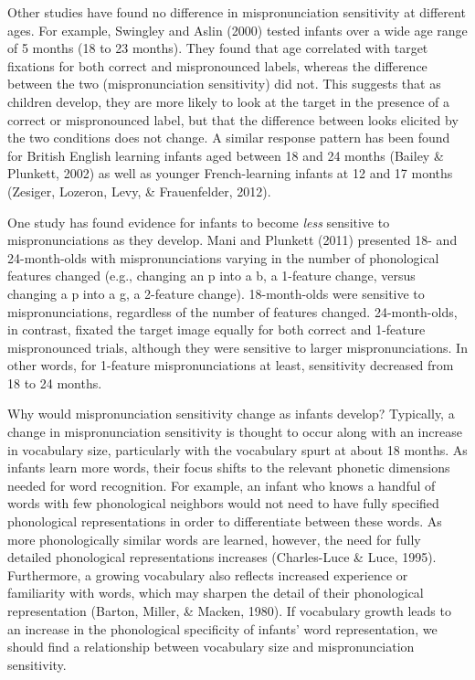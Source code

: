 \documentclass[man]{apa6}
\theoremstyle{definition}
\theoremstyle{definition}
\theoremstyle{definition}
\theoremstyle{remark}
\begin{document}
Other studies have found no difference in mispronunciation sensitivity
at different ages. For example, Swingley and Aslin (2000) tested infants
over a wide age range of 5 months (18 to 23 months). They found that age
correlated with target fixations for both correct and mispronounced
labels, whereas the difference between the two (mispronunciation
sensitivity) did not. This suggests that as children develop, they are
more likely to look at the target in the presence of a correct or
mispronounced label, but that the difference between looks elicited by
the two conditions does not change. A similar response pattern has been
found for British English learning infants aged between 18 and 24 months
(Bailey \& Plunkett, 2002) as well as younger French-learning infants at
12 and 17 months (Zesiger, Lozeron, Levy, \& Frauenfelder, 2012).

One study has found evidence for infants to become \emph{less} sensitive
to mispronunciations as they develop. Mani and Plunkett (2011) presented
18- and 24-month-olds with mispronunciations varying in the number of
phonological features changed (e.g., changing an p into a b, a 1-feature
change, versus changing a p into a g, a 2-feature change). 18-month-olds
were sensitive to mispronunciations, regardless of the number of
features changed. 24-month-olds, in contrast, fixated the target image
equally for both correct and 1-feature mispronounced trials, although
they were sensitive to larger mispronunciations. In other words, for
1-feature mispronunciations at least, sensitivity decreased from 18 to
24 months.

Why would mispronunciation sensitivity change as infants develop?
Typically, a change in mispronunciation sensitivity is thought to occur
along with an increase in vocabulary size, particularly with the
vocabulary spurt at about 18 months. As infants learn more words, their
focus shifts to the relevant phonetic dimensions needed for word
recognition. For example, an infant who knows a handful of words with
few phonological neighbors would not need to have fully specified
phonological representations in order to differentiate between these
words. As more phonologically similar words are learned, however, the
need for fully detailed phonological representations increases
(Charles-Luce \& Luce, 1995). Furthermore, a growing vocabulary also
reflects increased experience or familiarity with words, which may
sharpen the detail of their phonological representation (Barton, Miller,
\& Macken, 1980). If vocabulary growth leads to an increase in the
phonological specificity of infants' word representation, we should find
a relationship between vocabulary size and mispronunciation sensitivity.
\end{document}
